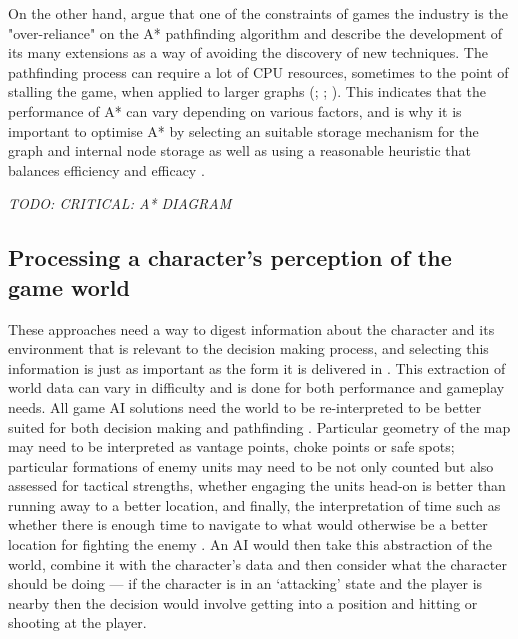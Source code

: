 \documentclass[11pt, a4paper]{report}
\begin{document}
On the other hand, \citeauthor{graham2003pathfinding} \parencite*[68]{graham2003pathfinding} argue that one of the constraints of games the industry is the "over-reliance" on the A* pathfinding algorithm and describe the development of its many extensions as a way of avoiding the discovery of new techniques. The pathfinding process can require a lot of CPU resources, sometimes to the point of stalling the game, when applied to larger graphs (\cite[127]{cui2011based}; \cite[110]{stentz1996map}; \cite[67]{graham2003pathfinding}). This indicates that the performance of A* can vary depending on various factors, and is why it is important to optimise A* by selecting an suitable storage mechanism for the graph and internal node storage as well as using a reasonable heuristic that balances efficiency and efficacy \parencite[228]{millington2019ai}.

\emph{TODO: CRITICAL: A* DIAGRAM}

\subsection{Processing a character's perception of the game world}
\label{subsec:processingACharactersPerception}

These approaches need a way to digest information about the character and its environment that is relevant to the decision making process, and selecting this information is just as important as the form it is delivered in \parencite[126]{cui2011based}. This extraction of world data can vary in difficulty \parencite[3]{diller2004behavior} and is done for both performance and gameplay needs. All game AI solutions need the world to be re-interpreted to be better suited for both decision making \parencite[2]{buro2004call} and pathfinding \parencite[3]{diller2004behavior}. Particular geometry of the map may need to be interpreted as vantage points, choke points or safe spots; particular formations of enemy units may need to be not only counted but also assessed for tactical strengths, whether engaging the units head-on is better than running away to a better location, and finally, the interpretation of time such as whether there is enough time to navigate to what would otherwise be a better location for fighting the enemy \parencite{buro2004call}. An AI would then take this abstraction of the world, combine it with the character's data and then consider what the character should be doing --- if the character is in an `attacking' state and the player is nearby then the decision would involve getting into a position and hitting or shooting at the player. 
\end{document}
